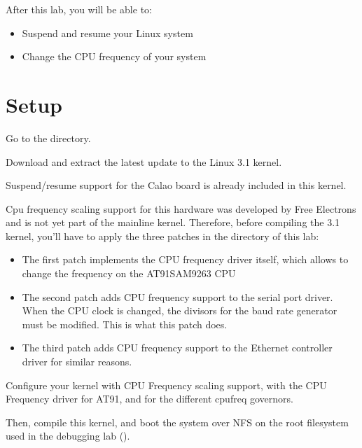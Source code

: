 
After this lab, you will be able to:

\begin{itemize}
\item Suspend and resume your Linux system
\item Change the CPU frequency of your system
\end{itemize}

\section{Setup}

Go to the  directory.

Download and extract the latest update to the Linux 3.1 kernel.

Suspend/resume support for the Calao board is already included in this
kernel.

Cpu frequency scaling support for this hardware was developed by Free
Electrons and is not yet part of the mainline kernel. Therefore,
before compiling the 3.1 kernel, you'll have to apply the three
patches in the  directory of this lab:

\begin{itemize}

\item The first patch implements the CPU frequency driver itself,
  which allows to change the frequency on the AT91SAM9263 CPU

\item The second patch adds CPU frequency support to the serial port
  driver. When the CPU clock is changed, the divisors for the baud
  rate generator must be modified. This is what this patch does.

\item The third patch adds CPU frequency support to the Ethernet
  controller driver for similar reasons.

\end{itemize}

Configure your kernel with CPU Frequency scaling support, with the CPU
Frequency driver for AT91, and for the different cpufreq governors.

Then, compile this kernel, and boot the system over NFS on the root 
filesystem used in the debugging lab ().

